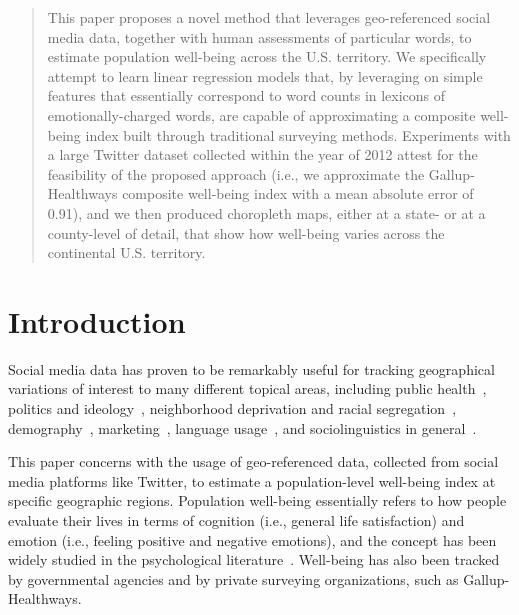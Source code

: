 \documentclass{acm_proc_article-sp}
\begin{document}
\begin{abstract}
This paper proposes a novel method that leverages geo-referenced social media data, together with human assessments of particular words, to estimate population well-being across the U.S. territory. We specifically attempt to learn linear regression models that, by leveraging on simple features that essentially correspond to word counts in lexicons of emotionally-charged words, are capable of approximating a composite well-being index built through traditional surveying methods. Experiments with a large Twitter dataset collected within the year of 2012 attest for the feasibility of the proposed approach (i.e., we approximate the Gallup-Healthways composite well-being index with a mean absolute error of 0.91), and we then produced choropleth maps, either at a state- or at a
county-level of detail, that show how well-being varies across the continental U.S. territory.
\end{abstract}




\section{Introduction}

Social media data has proven to be remarkably useful for tracking geographical variations of interest to many different topical areas, including public health~\cite{Paul:2011:Tweets,Culotta:2014:ECH:2611105.2557139}, politics and ideology~\cite{Smith:2010:Tweets}, neighborhood deprivation and racial segregation~\cite{Quercia:2013:UCG:2487788.2488000}, demography~\cite{Adnan:2013:Tweets}, marketing~\cite{Gopinath:2014:Tweets}, language usage~\cite{Mocanu:2013:Tweets}, and sociolinguistics in general~\cite{Eisenstein:2011:DSA:2002472.2002641}.

This paper concerns with the usage of geo-referenced data, collected from social media platforms like Twitter, to estimate a population-level well-being index at specific geographic regions. Population well-being essentially refers to how people evaluate their lives in terms of cognition (i.e., general life satisfaction) and emotion (i.e., feeling positive and negative emotions), and the concept has been widely studied in the psychological literature~\cite{Diener:2000:Well-Being,Mackerron12}. Well-being has also been tracked by governmental agencies and by private surveying organizations, such as Gallup-Healthways.
\end{document}
